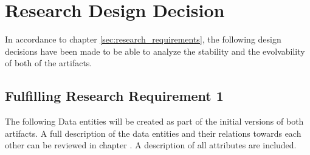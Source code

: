 \section{Research Design Decision} \label{sec:research_design_decisions}

In accordance to chapter \ref{sec:research_requirements}, the following design decisions
have been made to be able to analyze the stability and the evolvability of both
of the artifacts.

\subsection{Fulfilling Research Requirement 1}
The following Data entities will be created as part of the initial versions of both
artifacts. A full description of the data entities and their relations towards each other
can be reviewed in chapter . A description of all
attributes are included.

